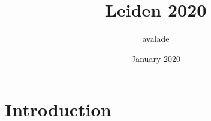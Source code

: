 \documentclass{article}
\title{Leiden 2020}
\author{avalade}
\date{January 2020}
\begin{document}
\maketitle

\section{Introduction}
\end{document}
